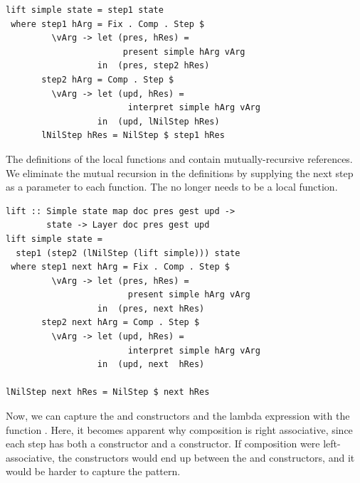 \documentclass[preprint,natbib]{sigplanconf}
\begin{document}
\begin{small} %
\begin{verbatim}
lift simple state = step1 state 
 where step1 hArg = Fix . Comp . Step $
         \vArg -> let (pres, hRes) = 
                       present simple hArg vArg
                  in  (pres, step2 hRes)
       step2 hArg = Comp . Step $
         \vArg -> let (upd, hRes) = 
                        interpret simple hArg vArg
                  in  (upd, lNilStep hRes)
       lNilStep hRes = NilStep $ step1 hRes
\end{verbatim}%
\end{small}

The definitions of the local functions  and  contain mutually-recursive references. We eliminate the mutual recursion in the definitions by supplying the next step as a parameter to each function. The  no longer needs to be a local function.

      
      
\begin{small} %
\begin{verbatim}
lift :: Simple state map doc pres gest upd -> 
        state -> Layer doc pres gest upd
lift simple state =  
  step1 (step2 (lNilStep (lift simple))) state
 where step1 next hArg = Fix . Comp . Step $
         \vArg -> let (pres, hRes) = 
                        present simple hArg vArg
                  in  (pres, next hRes)
       step2 next hArg = Comp . Step $
         \vArg -> let (upd, hRes) = 
                        interpret simple hArg vArg
                  in  (upd, next  hRes)

lNilStep next hRes = NilStep $ next hRes
\end{verbatim}%
\end{small}

Now, we can capture the  and  constructors and the lambda expression with the function . Here, it becomes apparent why composition is right associative, since each step has both a constructor and a  constructor. If composition were left-associative, the  constructors would end up between the  and  constructors, and it would be harder to capture the pattern.
\end{document}
